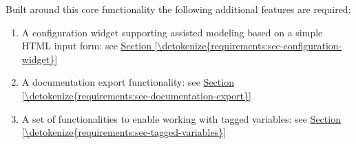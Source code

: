 \documentclass[letterpaper,10pt, openany,english]{sphinxmanual}
\begin{document}
Built around this core functionality the following additional features are required:
\begin{enumerate}
%
\item {} 
A configuration widget supporting assisted modeling based on a simple HTML input form: see \hyperref[\detokenize{requirements:sec-configuration-widget}]{Section \ref{\detokenize{requirements:sec-configuration-widget}}}

\item {} 
A documentation export functionality: see \hyperref[\detokenize{requirements:sec-documentation-export}]{Section \ref{\detokenize{requirements:sec-documentation-export}}}

\item {} 
A set of functionalities to enable working with tagged variables: see \hyperref[\detokenize{requirements:sec-tagged-variables}]{Section \ref{\detokenize{requirements:sec-tagged-variables}}}

\end{enumerate}
\end{document}
